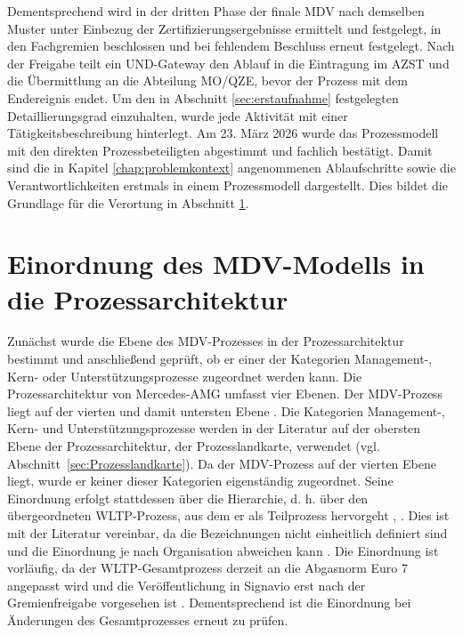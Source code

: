 \newline
Dementsprechend wird in der dritten Phase der finale MDV nach demselben Muster unter Einbezug der Zertifizierungsergebnisse ermittelt und festgelegt, in den Fachgremien beschlossen und bei fehlendem Beschluss erneut festgelegt. Nach der Freigabe teilt ein UND-Gateway den Ablauf in die Eintragung im \acs{AZST} und die Übermittlung an die Abteilung \glqq MO/QZE\grqq , bevor der Prozess mit dem Endereignis endet.
\newline
Um den in Abschnitt \ref{sec:erstaufnahme} festgelegten Detaillierungsgrad einzuhalten, wurde jede Aktivität mit einer Tätigkeitsbeschreibung hinterlegt. Am 23. März 2026 wurde das Prozessmodell mit den direkten Prozessbeteiligten abgestimmt und fachlich bestätigt. Damit sind die in Kapitel \ref{chap:problemkontext} angenommenen Ablaufschritte sowie die Verantwortlichkeiten erstmals in einem Prozessmodell dargestellt. Dies bildet die Grundlage für die Verortung in Abschnitt \ref{sec:verortung}.

\section{Einordnung des MDV-Modells in die Prozessarchitektur}
\label{sec:verortung}

Zunächst wurde die Ebene des MDV-Prozesses in der Prozessarchitektur bestimmt und anschließend geprüft, ob er einer der Kategorien Management-, Kern- oder Unterstützungsprozesse zugeordnet werden kann. Die Prozessarchitektur von Mercedes-AMG umfasst vier Ebenen. Der MDV-Prozess liegt auf der vierten und damit untersten Ebene .
\newline
Die Kategorien Management-, Kern- und Unterstützungsprozesse werden in der Literatur auf der obersten Ebene der Prozessarchitektur, der Prozesslandkarte, verwendet (vgl. Abschnitt~\ref{sec:Prozesslandkarte}). Da der MDV-Prozess auf der vierten Ebene liegt, wurde er keiner dieser Kategorien eigenständig zugeordnet. Seine Einordnung erfolgt stattdessen über die Hierarchie, d. h. über den übergeordneten \acs{WLTP}-Prozess, aus dem er als Teilprozess hervorgeht  , . Dies ist mit der Literatur vereinbar, da die Bezeichnungen nicht einheitlich definiert sind und die Einordnung je nach Organisation abweichen kann \cite{ottenlips2025geschaftsprozessmanagement}.
\newline
Die Einordnung ist vorläufig, da der WLTP-Gesamtprozess derzeit an die Abgasnorm Euro 7 angepasst wird und die Veröffentlichung in Signavio erst nach der Gremienfreigabe vorgesehen ist . Dementsprechend ist die Einordnung bei Änderungen des Gesamtprozesses erneut zu prüfen. 





